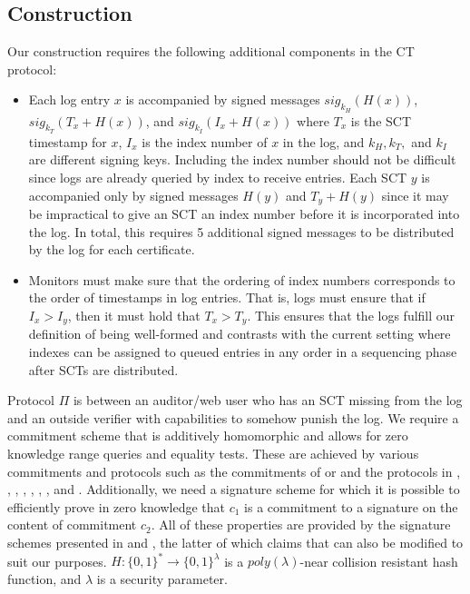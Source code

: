 \documentclass[letterpaper,twocolumn,10pt]{article}
\begin{document}
\subsection{Construction}
Our construction requires the following additional components in the CT protocol:
\begin{itemize}
\item Each log entry $x$ is accompanied by signed messages $sig_{k_H}(H(x))$, $sig_{k_T}(T_x+H(x))$, and $sig_{k_I}(I_x+H(x))$ where $T_x$ is the SCT timestamp for $x$, $I_x$ is the index number of $x$ in the log, and $k_H, k_T,$ and $k_I$ are different signing keys. Including the index number should not be difficult since logs are already queried by index to receive entries. Each SCT $y$ is accompanied only by signed messages $H(y)$ and $T_y+H(y)$ since it may be impractical to give an SCT an index number before it is incorporated into the log. In total, this requires 5 additional signed messages to be distributed by the log for each certificate.

\item Monitors must make sure that the ordering of index numbers corresponds to the order of timestamps in log entries. That is, logs must ensure that if $I_x>I_y$, then it must hold that $T_x>T_y$. This ensures that the logs fulfill our definition of being well-formed and contrasts with the current setting where indexes can be assigned to queued entries in any order in a sequencing phase after SCTs are distributed. 
\end{itemize}

Protocol $\Pi$ is between an auditor/web user who has an SCT missing from the log and an outside verifier with capabilities to somehow punish the log. We require a commitment scheme that is additively homomorphic and allows for zero knowledge range queries and equality tests. These are achieved by various commitments and protocols such as the commitments of \cite{Ped92} or \cite{DF01} and the protocols in \cite{CM01}, \cite{Bou00}, \cite{DBB+15}, \cite{CP93}, \cite{Sch91}, \cite{Bra97}, \cite{CEvdG87}, and \cite{CCS08}. Additionally, we need a signature scheme for which it is possible to efficiently prove in zero knowledge that $c_1$ is a commitment to a signature on the content of commitment $c_2$. All of these properties are provided by the signature schemes presented in \cite{CL02} and \cite{CL04}, the latter of which claims that \cite{BBS04} can also be modified to suit our purposes. $H: \{0,1\}^*\rightarrow\{0,1\}^\lambda$ is a $poly(\lambda)$-near collision resistant hash function, and $\lambda$ is a security parameter.
\end{document}
